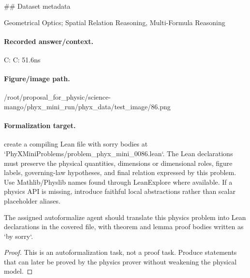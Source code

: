 \#\# Dataset metadata

Geometrical Optics; Spatial Relation Reasoning, Multi-Formula Reasoning

\paragraph{Recorded answer/context.}
C: C: 51.6ns

\paragraph{Figure/image path.}
/root/proposal\_for\_physic/science-mango/phyx\_mini\_run/phyx\_data/test\_image/86.png

\paragraph{Formalization target.}
create a compiling Lean file with sorry bodies at `PhyXMiniProblems/problem\_phyx\_mini\_0086.lean`. The Lean declarations must preserve the physical quantities, dimensions or dimensional roles, figure labels, governing-law hypotheses, and final relation expressed by this problem.
Use Mathlib/Physlib names found through LeanExplore where available. If a physics API is missing, introduce faithful local abstractions rather than scalar placeholder aliases.

\begin{theorem}
\label{thm:physics:phyx_mini_0086:target}
The assigned autoformalize agent should translate this physics problem into Lean declarations in the covered file, with theorem and lemma proof bodies written as `by sorry`.
\end{theorem}
\begin{proof}
This is an autoformalization task, not a proof task. Produce statements that can later be proved by the physics prover without weakening the physical model.
\end{proof}

